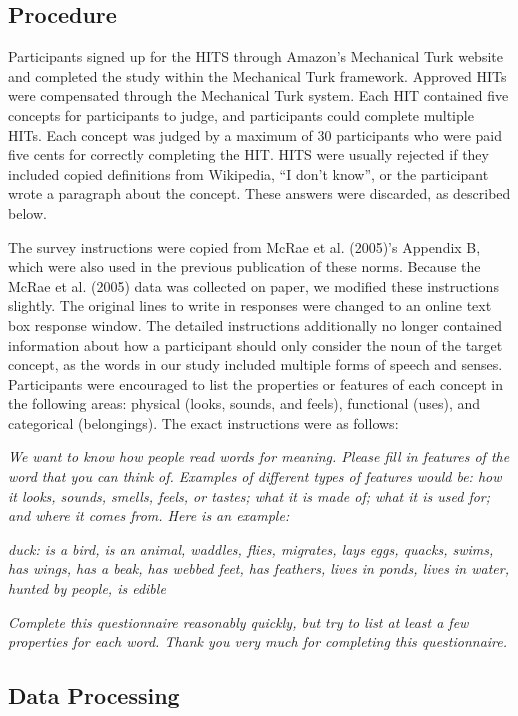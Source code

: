 \documentclass[english,,man]{apa6}
\begin{document}
\hypertarget{procedure}{%
\subsection{Procedure}\label{procedure}}

Participants signed up for the HITS through Amazon's Mechanical Turk website and completed the study within the Mechanical Turk framework. Approved HITs were compensated through the Mechanical Turk system. Each HIT contained five concepts for participants to judge, and participants could complete multiple HITs. Each concept was judged by a maximum of 30 participants who were paid five cents for correctly completing the HIT. HITS were usually rejected if they included copied definitions from Wikipedia, \enquote{I don't know}, or the participant wrote a paragraph about the concept. These answers were discarded, as described below.

The survey instructions were copied from McRae et al. (2005)'s Appendix B, which were also used in the previous publication of these norms. Because the McRae et al. (2005) data was collected on paper, we modified these instructions slightly. The original lines to write in responses were changed to an online text box response window. The detailed instructions additionally no longer contained information about how a participant should only consider the noun of the target concept, as the words in our study included multiple forms of speech and senses. Participants were encouraged to list the properties or features of each concept in the following areas: physical (looks, sounds, and feels), functional (uses), and categorical (belongings). The exact instructions were as follows:

\emph{We want to know how people read words for meaning. Please fill in features of the word that you can think of. Examples of different types of features would be: how it looks, sounds, smells, feels, or tastes; what it is made of; what it is used for; and where it comes from. Here is an example:}

\emph{duck: is a bird, is an animal, waddles, flies, migrates, lays eggs, quacks, swims, has wings, has a beak, has webbed feet, has feathers, lives in ponds, lives in water, hunted by people, is edible}

\emph{Complete this questionnaire reasonably quickly, but try to list at least a few properties for each word. Thank you very much for completing this questionnaire.}

\hypertarget{data-processing}{%
\subsection{Data Processing}\label{data-processing}}
\end{document}

